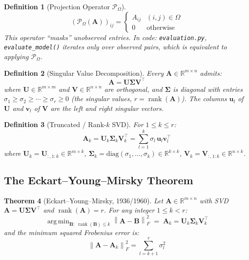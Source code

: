 \documentclass[12pt, a4paper]{article}
\newtheorem{theorem}{Theorem}[section]
\newtheorem{definition}[theorem]{Definition}
\newcommand{\R}{\mathbb{R}}
\newcommand{\Umat}{\mathbf{U}}
\newcommand{\Smat}{\boldsymbol{\Sigma}}
\newcommand{\Vmat}{\mathbf{V}}
\newcommand{\norm}[1]{\left\| #1 \right\|}
\newcommand{\FroSq}[1]{\norm{#1}_{F}^{2}}
\newcommand{\Om}{\Omega}
\newcommand{\Proj}{\mathcal{P}_{\Omega}}
\DeclareMathOperator*{\argmin}{arg\,min}
\DeclareMathOperator*{\rank}{rank}
\newcommand{\file}[1]{\texttt{\small #1}}
\begin{document}
\begin{definition}[Projection Operator $\mathcal{P}_\Omega$]
\[
  (\Proj(\mathbf{A}))_{ij}
  = \begin{cases} A_{ij} & (i,j)\in\Om \\ 0 & \text{otherwise} \end{cases}
\]
This operator ``masks'' unobserved entries.
In code: \file{evaluation.py}, \texttt{evaluate\_model()} iterates
only over observed pairs, which is equivalent to applying $\Proj$.
\end{definition}

\begin{definition}[Singular Value Decomposition]
\label{def:svd}
Every $\mathbf{A} \in \R^{m \times n}$ admits:
\[
  \mathbf{A} = \Umat \Smat \Vmat^\top
\]
where $\Umat \in \R^{m\times m}$ and $\Vmat \in \R^{n\times n}$ are
orthogonal, and $\Smat$ is diagonal with entries
$\sigma_1 \geq \sigma_2 \geq \cdots \geq \sigma_r \geq 0$
(the \emph{singular values}, $r = \rank(\mathbf{A})$).
The columns $\mathbf{u}_l$ of $\Umat$ and $\mathbf{v}_l$ of $\Vmat$
are the \emph{left} and \emph{right singular vectors}.
\end{definition}

\begin{definition}[Truncated / Rank-$k$ SVD]
\label{def:tsvd}
For $1 \leq k \leq r$:
\[
  \mathbf{A}_k = \Umat_k \Smat_k \Vmat_k^\top
  = \sum_{l=1}^{k} \sigma_l \, \mathbf{u}_l \mathbf{v}_l^\top
\]
where $\Umat_k = \mathbf{U}_{:,1:k} \in \R^{m\times k}$,\;
$\Smat_k = \mathrm{diag}(\sigma_1,\ldots,\sigma_k) \in \R^{k\times k}$,\;
$\Vmat_k = \mathbf{V}_{:,1:k} \in \R^{n\times k}$.
\end{definition}

\subsection{The Eckart--Young--Mirsky Theorem}
\label{sec:ey}

\begin{theorem}[Eckart--Young--Mirsky, 1936/1960]
\label{thm:ey}
Let $\mathbf{A} \in \R^{m\times n}$ with SVD
$\mathbf{A} = \Umat\Smat\Vmat^\top$ and $\rank(\mathbf{A})=r$.
For any integer $1 \leq k < r$:
\[
  \argmin_{\mathbf{B}:\; \rank(\mathbf{B}) \leq k}
  \FroSq{\mathbf{A} - \mathbf{B}}
  \;=\;
  \mathbf{A}_k = \Umat_k \Smat_k \Vmat_k^\top
\]
and the minimum squared Frobenius error is:
\begin{equation}
  \FroSq{\mathbf{A} - \mathbf{A}_k}
  = \sum_{l=k+1}^{r} \sigma_l^2
  \label{eq:ey_error}
\end{equation}
\end{theorem}
\end{document}
